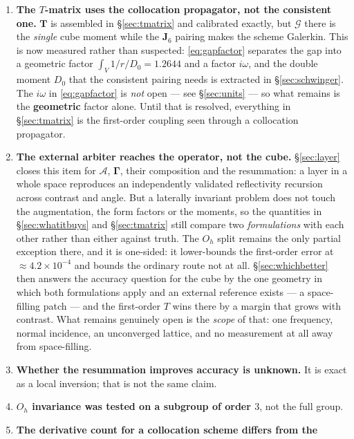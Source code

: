 \documentclass[11pt,a4paper]{article}
\newcommand{\Aop}{\mathcal{A}}
\newcommand{\Jsix}{\mathbf{J}_{6}}
\newcommand{\Oh}{O_{h}}
\begin{document}
\begin{enumerate}
\item \textbf{The $T$-matrix uses the collocation propagator, not the
      consistent one.}  $\mathbf{T}$ is assembled in \S\ref{sec:tmatrix} and
      calibrated exactly, but $\mathcal{G}$ there is the \emph{single} cube
      moment while the $\Jsix$ pairing makes the scheme Galerkin.  This is now
      measured rather than suspected: \eqref{eq:gapfactor} separates the gap
      into a geometric factor $\int_V 1/r \big/ D_0 = 1.2644$ and a factor
      $i\omega$, and the double moment $D_0$ that the consistent pairing needs is
      extracted in \S\ref{sec:schwinger}.  The $i\omega$ in
      \eqref{eq:gapfactor} is \emph{not} open --- see \S\ref{sec:units} --- so
      what remains is the \textbf{geometric} factor alone.  Until that is
      resolved, everything in \S\ref{sec:tmatrix} is the first-order coupling
      seen through a collocation propagator.
\item \textbf{The external arbiter reaches the operator, not the cube.}
      \S\ref{sec:layer} closes this item for $\Aop$, $\boldsymbol\Gamma$, their
      composition and the resummation: a layer in a whole space reproduces an
      independently validated reflectivity recursion across contrast and angle.
      But a laterally invariant problem does not touch the augmentation, the
      form factors or the moments, so the quantities in \S\ref{sec:whatitbuys}
      and \S\ref{sec:tmatrix} still compare two \emph{formulations} with each
      other rather than either against truth.  The $\Oh$ split remains the only
      partial exception there, and it is one-sided: it lower-bounds the
      first-order error at $\approx4.2\times10^{-4}$ and bounds the ordinary
      route not at all.  \S\ref{sec:whichbetter} then answers the accuracy
      question for the cube by the one geometry in which both formulations
      apply and an external reference exists --- a space-filling patch --- and
      the first-order $T$ wins there by a margin that grows with contrast.  What
      remains genuinely open is the \emph{scope} of that: one frequency, normal
      incidence, an unconverged lattice, and no measurement at all away from
      space-filling.
\item \textbf{Whether the resummation improves accuracy is unknown.}  It is
      exact as a local inversion; that is not the same claim.
\item \textbf{$\Oh$ invariance was tested on a subgroup of order $3$}, not the
      full group.
\item \textbf{The derivative count for a collocation scheme differs from the
}
\end{enumerate}
\end{document}
